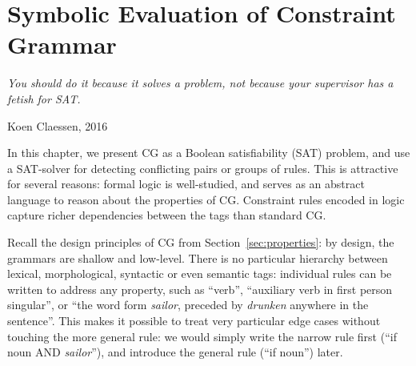 \def\newcite#1{\cite{#1}}

\def\noun{\textsc{N}}
\def\verb{\textsc{V}}
\def\sg{\textsc{Sg}}
\def\pl{\textsc{Pl}}
\def\detdef{\textsc{DetDef}}

\def\la{\text{\em la}}
\def\casa{\text{\em casa}}
\def\grande{\text{\em grande}}

\def\det{{\text{\sc Det}}}
\def\prn{{\text{\sc  Prn}}}
\def\n{{\text{\sc N}}}
\def\v{{\text{\sc V}}}
\def\adj{{\text{\sc Adj}}}

\def\laDet{\la_\det}
\def\laPrn{\la_\prn}
\def\casaN{\casa_\n}
\def\casaV{\casa_\v}
\def\grandeAdj{\grande_\adj}

\def\t#1{\texttt{#1}}
\def\ob#1{\overbrace{ #1 \rule{0pt}{2ex}}}
\def\cgrule#1{{\ttfamily #1}}


\def\newVar{$\text{\em word}'_\textsc{ RD}$}
\def\oldVar{$\text{\em word}_\textsc{\,RD}$}
\def\eqdef{\Coloneqq}
\def\invConds{\text{invalid condition}}
\def\onlyTrgLeft{\text{only target left}}

\def\defRule{``do not remove the last reading''}


\chapter{Symbolic Evaluation of Constraint Grammar}
\label{chapterCGSAT}

\epigraph{\it You should do it because it solves a problem, not because your supervisor has a fetish for SAT.}{Koen Claessen, 2016}

\noindent In this chapter, we present CG as a Boolean satisfiability
(SAT) problem, and use a SAT-solver for detecting conflicting pairs or
groups of rules.
This is attractive for several reasons: formal logic is
well-studied, and serves as an abstract language to reason about the
properties of CG. Constraint rules encoded in logic capture richer
dependencies between the tags than standard CG. 

Recall the design principles of CG from Section~\ref{sec:properties}: 
by design, the grammars are shallow and low-level.
There is no particular hierarchy between lexical, morphological,
syntactic or even semantic tags: individual rules can be written to address any
property, such as ``verb'', ``auxiliary verb in first person singular'',
or ``the word form \emph{sailor}, preceded by \emph{drunken} anywhere in the
sentence''. This makes it possible to treat very particular edge
cases without touching the more general rule: we would simply write
the narrow rule first (``if noun AND \emph{sailor}''), and introduce
the general rule (``if noun'') later.

